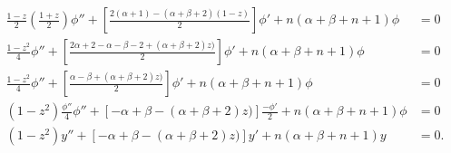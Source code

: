 \documentclass[a4paper,12pt, leqno, answers]{exam}
\begin{document}
\begin{questions}
\begin{solution}
\begin{align*}
            \frac{1 - z}{2} \left( \frac{1 + z}{2} \right) \phi'' + \left[ \frac{2(\alpha + 1) - (\alpha + \beta + 2) (1 - z)}{2} \right] \phi' + n (\alpha + \beta + n + 1) \phi &= 0 \\
            \frac{1 - z^2}{4} \phi'' + \left[ \frac{2\alpha + 2 - \alpha - \beta - 2 + (\alpha + \beta + 2)z)}{2} \right] \phi' + n (\alpha + \beta + n + 1) \phi &= 0 \\
            \frac{1 - z^2}{4} \phi'' + \left[ \frac{\alpha - \beta + (\alpha + \beta + 2)z)}{2} \right] \phi' + n (\alpha + \beta + n + 1) \phi &= 0 \\
            (1 - z^2) \frac{\phi''}{4} \phi'' + \left[ - \alpha + \beta - (\alpha + \beta + 2)z)\right] \frac{-\phi'}{2} + n (\alpha + \beta + n + 1) \phi &= 0 \\
            (1 - z^2) y'' + \left[ - \alpha + \beta - (\alpha + \beta + 2)z)\right] y' + n (\alpha + \beta + n + 1) y &= 0.
        \end{align*}
    \end{solution}


\end{questions}
\end{document}
